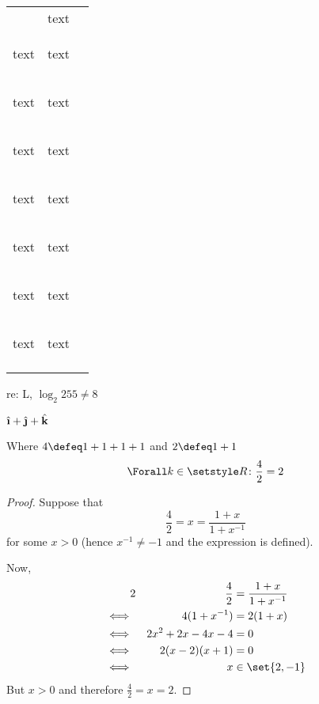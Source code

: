 \begin{longtable}{*3c}
\begin{tabular}{*2c}
\begin{footnotesize}text\end{footnotesize} &
{\footnotesize text} \\ %
\begin{small}text\end{small} &
{\small text} \\
\begin{normalsize}text\end{normalsize} &
{\normalsize text} \\ %
\begin{large}text\end{large} &
{\large text} \\
\begin{Large}text\end{Large} &
{\Large text} \\
\begin{LARGE}text\end{LARGE} &
{\LARGE text} \\
\begin{huge}text\end{huge} &
{\huge text} \\
\begin{Huge}text\end{Huge} &
{\Huge text} \\
\end{tabular} \\
\end{longtable}

re: L, \(\log_2 255 \ne 8\)

\(\uveci + \uvecj + \uveck\)

\begin{lemma}
Where \(4 \defeq 1 + 1 + 1 + 1\) and \(2 \defeq 1 + 1\)
\begin{equation*}
\Forall k \in \Reals \colon \frac 42 = 2
\end{equation*}
\end{lemma}

\begin{proof}
Suppose that
\begin{equation*}
\frac 42 = x = \frac{1 + x}{1 + x^{-1}}
\end{equation*}
for some \(x > 0\) (hence \(x^{-1} \neq -1\) and the expression is defined).

Now,
\begin{alignat*} 2
 &&\frac 42 &= \frac{1 + x}{1 + x^{-1}} \\
 \iff{}&& 4(1 + x^{-1}) &= 2(1 + x) \\
 \iff{}&& 2x^2 + 2x - 4x - 4 &= 0 \\
 \iff{}&& 2(x - 2)(x + 1) &= 0 \\
 \iff{}&& x &\in \set{2, -1} 
\end{alignat*}
But \(x > 0\) and therefore \(\frac 42 = x = 2\).
\end{proof}

